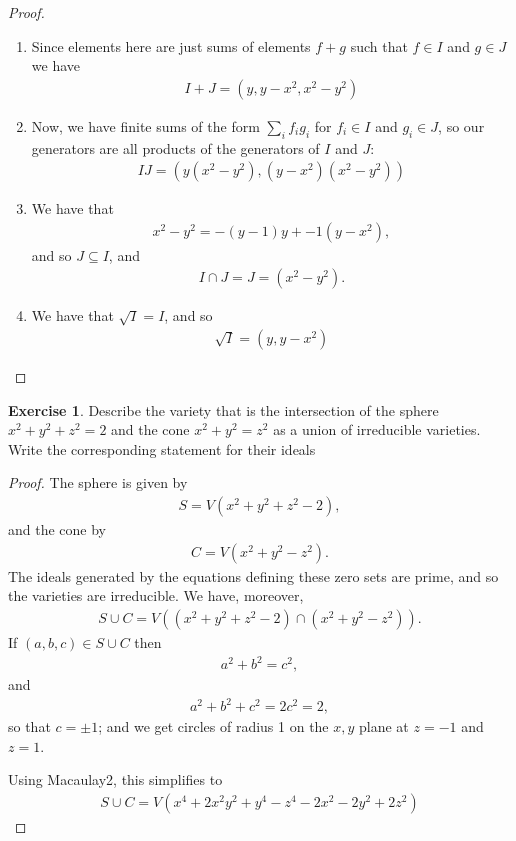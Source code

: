 \documentclass[12pt]{extarticle}
\newcommand{\<}{\langle}
\renewcommand{\>}{\rangle}
\theoremstyle{definition}
\newtheorem{exercise}{Exercise}
\begin{document}
\begin{proof}

  \begin{enumerate}
  \item
    Since elements here are just sums of elements $f + g$ such that $f \in I$ and $g \in J$ we have
    \begin{align}
      I + J = (y,y-x^2,x^2-y^2)
    \end{align}
  \item
    Now, we have finite sums of the form $\sum\limits_i f_i g_i$ for $f_i \in I$ and $g_i \in J$, so our generators are all products of the generators of $I$ and $J$:
    \begin{align}
      IJ = (y(x^2-y^2), (y-x^2)(x^2-y^2))
    \end{align}
    
  \item
    We have that
    \begin{align*}
      x^2 - y^2 = -(y-1)y + -1(y-x^2),
    \end{align*}
    and so $J \subseteq I$, and
    \begin{align*}
      I \cap J = J = (x^2-y^2).
    \end{align*}
  \item
    We have that $\sqrt{I} = I$, and so
    \begin{align*}
      \sqrt{I} = (y, y-x^2)
    \end{align*}
  \end{enumerate}
\end{proof}

\begin{exercise}
  Describe the variety that is the intersection of the sphere $x^2+y^2+z^2 = 2$ and the cone $x^2+y^2=z^2$ as a union of irreducible varieties. Write the corresponding statement for their ideals
\end{exercise}
\begin{proof}
  The sphere is given by
  \begin{align*}
    S = V(x^2+y^2+z^2 - 2),
  \end{align*}
  and the cone by
  \begin{align*}
    C = V(x^2+y^2-z^2).
  \end{align*}
  The ideals generated by the equations defining these zero sets are prime, and so the varieties are irreducible. We have, moreover, 
  \begin{align*}
    S \cup C = V((x^2+y^2+z^2-2) \cap (x^2+y^2 - z^2)).
  \end{align*}
  If $(a,b,c) \in S \cup C$ then
  \begin{align*}
    a^2 + b^2 = c^2,
  \end{align*}
  and
  \begin{align*}
    a^2 + b^2 + c^2 = 2c^2 = 2,
  \end{align*}
  so that $c = \pm 1$; and we get circles of radius 1 on the $x,y$ plane at $z=-1$ and $z=1$.

  Using Macaulay2, this simplifies to
  \begin{align*}
    S \cup C = V(x^4+2x^2y^2 + y^4 - z^4 - 2x^2 - 2y^2 + 2z^2)
  \end{align*}
\end{proof}
\end{document}
